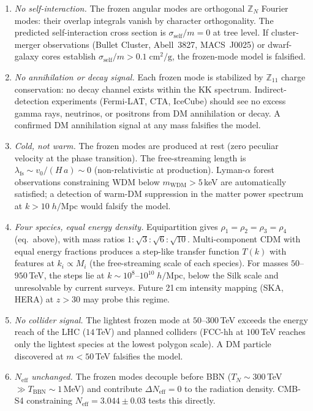 \begin{enumerate}
\item \emph{No self-interaction.}
  The frozen angular modes are orthogonal $\mathbb{Z}_N$
  Fourier modes: their overlap integrals vanish by character
  orthogonality.
  The predicted self-interaction cross section is
  $\sigma_{\mathrm{self}}/m = 0$ at tree level.
  If cluster-merger observations
  (Bullet Cluster, Abell~3827, MACS~J0025)
  or dwarf-galaxy cores establish
  $\sigma_{\mathrm{self}}/m > 0.1\;\mathrm{cm^2/g}$,
  the frozen-mode model is falsified.
\item \emph{No annihilation or decay signal.}
  Each frozen mode is stabilized by
  $\mathbb{Z}_{11}$ charge conservation:
  no decay channel exists within the KK spectrum.
  Indirect-detection experiments
  (Fermi-LAT, CTA, IceCube) should see no
  excess gamma rays, neutrinos, or positrons from
  DM annihilation or decay.
  A confirmed DM annihilation signal at any mass
  falsifies the model.
\item \emph{Cold, not warm.}
  The frozen modes are produced at rest
  (zero peculiar velocity at the phase transition).
  The free-streaming length is
  $\lambda_{\mathrm{fs}} \sim v_0/(H\,a)
  \sim 0$ (non-relativistic at production).
  Lyman-$\alpha$ forest observations constraining
  WDM below $m_{\mathrm{WDM}} > 5$\,keV are automatically
  satisfied; a detection of warm-DM suppression
  in the matter power spectrum at $k > 10\;h/$Mpc
  would falsify the model.
\item \emph{Four species, equal energy density.}
  Equipartition gives $\rho_1 = \rho_2 = \rho_3 = \rho_4$
  (eq.~above), with mass ratios
  $1:\sqrt{3}:\sqrt{6}:\sqrt{10}$.
  Multi-component CDM with equal energy fractions
  produces a step-like transfer function
  $T(k)$ with features at $k_i \propto M_i$
  (the free-streaming scale of each species).
  For masses $50$--$950$\,TeV, the steps lie at
  $k \sim 10^8$--$10^{10}\;h/$Mpc, below the Silk scale
  and unresolvable by current surveys.
  Future 21\,cm intensity mapping (SKA, HERA) at
  $z > 30$ may probe this regime.
\item \emph{No collider signal.}
  The lightest frozen mode at $50$--$300$\,TeV
  exceeds the energy reach of the LHC ($14$\,TeV)
  and planned colliders (FCC-hh at $100$\,TeV
  reaches only the lightest species at the lowest
  polygon scale).
  A DM particle discovered at $m < 50$\,TeV
  falsifies the model.
\item \emph{$N_{\mathrm{eff}}$ unchanged.}
  The frozen modes decouple before BBN
  ($T_N \sim 300$\,TeV $\gg T_{\mathrm{BBN}} \sim 1$\,MeV)
  and contribute $\Delta N_{\mathrm{eff}} = 0$
  to the radiation density.
  CMB-S4 constraining $N_{\mathrm{eff}} = 3.044 \pm 0.03$
  tests this directly.
\end{enumerate}


